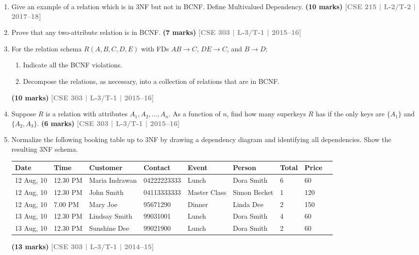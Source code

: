 \documentclass[12pt]{article}
\newcommand{\yr}[1]{\hfill\textcolor{gray}{\small\textbf{[#1]}}}
\newcommand{\mk}[1]{\textcolor{orange!70!black}{\small\textbf{(#1 marks)}}}
\begin{document}
\begin{enumerate}
\item Give an example of a relation which is in 3NF but not in BCNF. Define Multivalued Dependency.
\mk{10} \yr{CSE 215 | L-2/T-2 | 2017--18}


\item Prove that any two-attribute relation is in BCNF.
\mk{7} \yr{CSE 303 | L-3/T-1 | 2015--16}


\item For the relation schema $R(A, B, C, D, E)$ with FDs $AB \to C$, $DE \to C$, and $B \to D$:
\begin{enumerate}
  \item Indicate all the BCNF violations.
  \item Decompose the relations, as necessary, into a collection of relations that are in BCNF.
\end{enumerate}
\mk{10} \yr{CSE 303 | L-3/T-1 | 2015--16}


\item Suppose $R$ is a relation with attributes $A_1, A_2, \ldots, A_n$. As a function of $n$, find how many superkeys $R$ has if the only keys are $\{A_1\}$ and $\{A_2, A_3\}$.
\mk{6} \yr{CSE 303 | L-3/T-1 | 2015--16}



\item Normalize the following booking table up to 3NF by drawing a dependency diagram and identifying all dependencies. Show the resulting 3NF schema.

\medskip
\begin{center}
\small
\begin{tabular}{lllllllll}
\toprule
\textbf{Date} & \textbf{Time} & \textbf{Customer} & \textbf{Contact} & \textbf{Event} & \textbf{Person} & \textbf{Total} & \textbf{Price}\\
\midrule
12 Aug, 10 & 12.30 PM & Maria Indrawan & 04222223333 & Lunch & Dora Smith & 6 & 60\\
12 Aug, 10 & 12.30 PM & John Smith & 04113333333 & Master Class & Simon Becket & 1 & 120\\
12 Aug, 10 & 7.00 PM & Mary Joe & 95671290 & Dinner & Linda Dee & 2 & 150\\
13 Aug, 10 & 12.30 PM & Lindsay Smith & 99031001 & Lunch & Dora Smith & 4 & 60\\
13 Aug, 10 & 12.30 PM & Sunshine Dee & 99021900 & Lunch & Dora Smith & 2 & 60\\
\bottomrule
\end{tabular}
\end{center}
\mk{13} \yr{CSE 303 | L-3/T-1 | 2014--15}



\end{enumerate}
\end{document}
